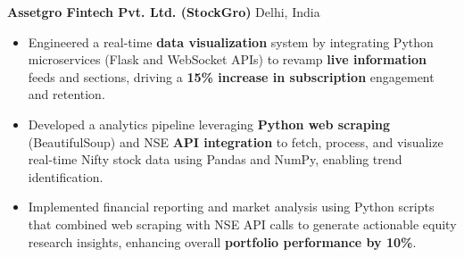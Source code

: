 \documentclass[10pt]{extarticle}
\begin{document}
\begin{itemize}
    \textbf{Assetgro Fintech Pvt. Ltd. (StockGro)} \hfill Delhi, India
    \begin{itemize}
        \item Engineered a real-time \textbf{data visualization} system by integrating Python microservices (Flask and WebSocket APIs) to revamp \textbf{live information} feeds and sections, driving a \textbf{15\% increase in subscription} engagement and retention.
        \item Developed a analytics pipeline leveraging \textbf{Python web scraping} (BeautifulSoup) and NSE \textbf{API integration} to fetch, process, and visualize real-time Nifty stock data using Pandas and NumPy, enabling trend identification.
        \item Implemented financial reporting and market analysis using Python scripts that combined web scraping with NSE API calls to generate actionable equity research insights, enhancing overall \textbf{portfolio performance by 10\%}.
    \end{itemize}
\end{itemize}
\end{document}
